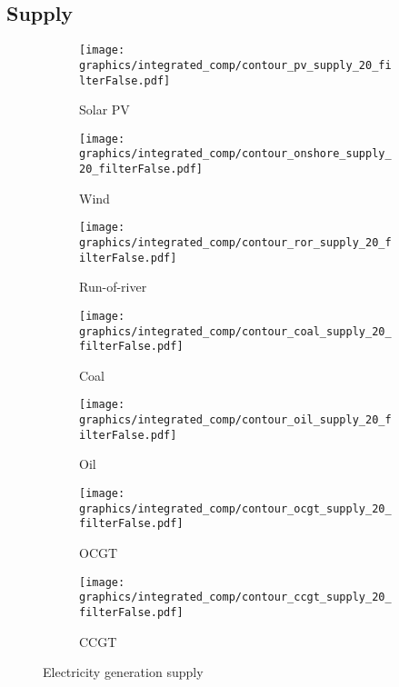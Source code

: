 
\clearpage

\subsection{Supply}

\begin{figure*}[t] %
    \centering
    \begin{subfigure}[b]{0.45\linewidth}
        \centering
        \texttt{[image: graphics/integrated\_comp/contour\_pv\_supply\_20\_filterFalse.pdf]}
        \caption{Solar PV}
    \end{subfigure}
    \hfill
    \begin{subfigure}[b]{0.45\linewidth}
        \centering
        \texttt{[image: graphics/integrated\_comp/contour\_onshore\_supply\_20\_filterFalse.pdf]}
        \caption{Wind}
    \end{subfigure}
    \hfill
    \begin{subfigure}[b]{0.45\linewidth}
        \centering
        \texttt{[image: graphics/integrated\_comp/contour\_ror\_supply\_20\_filterFalse.pdf]}
        \caption{Run-of-river}
    \end{subfigure}
    \hfill
    \begin{subfigure}[b]{0.45\linewidth}
        \centering
        \texttt{[image: graphics/integrated\_comp/contour\_coal\_supply\_20\_filterFalse.pdf]}
        \caption{Coal}
    \end{subfigure}
    \hfill
    \begin{subfigure}[b]{0.45\linewidth}
        \centering
        \texttt{[image: graphics/integrated\_comp/contour\_oil\_supply\_20\_filterFalse.pdf]}
        \caption{Oil}
    \end{subfigure}
    \hfill
    \begin{subfigure}[b]{0.45\linewidth}
        \centering
        \texttt{[image: graphics/integrated\_comp/contour\_ocgt\_supply\_20\_filterFalse.pdf]}
        \caption{OCGT}
    \end{subfigure}
    \hfill
    \begin{subfigure}[b]{0.45\linewidth}
        \centering
        \texttt{[image: graphics/integrated\_comp/contour\_ccgt\_supply\_20\_filterFalse.pdf]}
        \caption{CCGT}
    \end{subfigure}
    \hfill

    \caption{Electricity generation supply}
    \label{fig:capacities}
\end{figure*}


